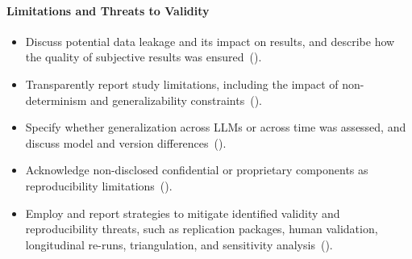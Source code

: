 \paragraph{\textbf{Limitations and Threats to Validity}}
\begin{itemize}[label={},leftmargin=*]
    \item \iconM Discuss potential data leakage and its impact on results, and describe how the quality of subjective results was ensured~().
    \item \iconM Transparently report study limitations, including the impact of non-determinism and generalizability constraints~().
    \item \iconM Specify whether generalization across LLMs or across time was assessed, and discuss model and version differences~().
    \item \iconM {} Acknowledge non-disclosed confidential or proprietary components as reproducibility limitations~().
    \item \iconS Employ and report strategies to mitigate identified validity and reproducibility threats, such as replication packages, human validation, longitudinal re-runs, triangulation, and sensitivity analysis~().
\end{itemize}
